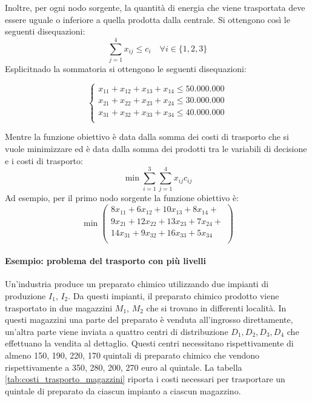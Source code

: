 \documentclass{article}
\begin{document}
Inoltre, per ogni nodo sorgente, la quantità di energia che viene trasportata 
deve essere uguale o inferiore a quella prodotta dalla centrale. Si ottengono 
così le seguenti disequazioni:
\begin{equation*}
  \sum_{j=1}^4 x_{ij} \leq c_i \quad \forall i \in \{1,2,3\} 
\end{equation*}
Esplicitnado la sommatoria si ottengono le seguenti disequazioni:

\begin{equation*}
  \begin{cases}
  x_{11} + x_{12} + x_{13} + x_{14} \leq 50.000.000\\
  x_{21} + x_{22} + x_{23} + x_{24} \leq 30.000.000\\
  x_{31} + x_{32} + x_{33} + x_{34} \leq 40.000.000\\
  \end{cases}
\end{equation*}

Mentre la funzione obiettivo è data dalla somma dei costi di trasporto che si 
vuole minimizzare ed è data dalla somma dei prodotti tra le variabili di 
decisione e i costi di trasporto:
\begin{equation*}
  \min \sum_{i=1}^3 \sum_{j=1}^4 x_{ij} c_{ij}
\end{equation*}
Ad esempio, per il primo nodo sorgente la funzione obiettivo è:
\begin{equation*}
  \min
  \begin{pmatrix}
    8x_{11} + 6x_{12} + 10x_{13} + 8x_{14} +\\ 
    9x_{21} + 12x_{22} + 13x_{23} + 7x_{24} +\\
    14x_{31} + 9x_{32} + 16x_{33} + 5x_{34} \\
  \end{pmatrix}
\end{equation*}


\paragraph{Esempio: problema del trasporto con più livelli}
Un’industria produce un preparato chimico utilizzando due impianti di produzione
$I_1$, $I_2$. Da questi impianti, il preparato chimico prodotto viene 
trasportato in due magazzini $M_1$, $M_2$ che si trovano in differenti località. 
In questi magazzini una parte del preparato è venduta all’ingrosso direttamente, 
un’altra parte viene inviata a quattro centri di distribuzione $D_1, D_2, D_3, 
D_4$ che effettuano la vendita al dettaglio. Questi centri necessitano 
rispettivamente di almeno 150, 190, 220, 170 quintali di preparato chimico che 
vendono rispettivamente a 350, 280, 200, 270 euro al quintale. La tabella 
\ref {tab:costi_trasporto_magazzini} riporta i costi necessari per trasportare
un quintale di preparato da ciascun impianto a ciascun magazzino.
\end{document}
